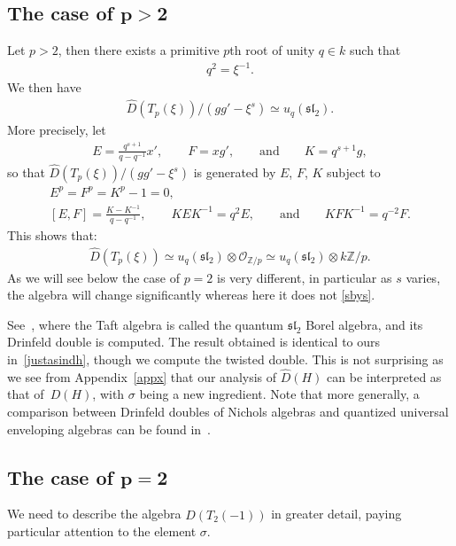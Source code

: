 \documentclass[pdftex]{sigma}
\numberwithin{equation}{section}
\newcommand{\ot}{\otimes}
\newcommand{\zp}{\mathbb{Z}/p}
\begin{document}
\subsection[The case of p>2]{The case of $\boldsymbol{p>2}$}
Let $p>2$, then there exists a primitive $p$th root of unity $q\in k$ such that
\begin{gather}
q^2=\xi^{-1}.
\end{gather}
We then have
\begin{gather}\label{sbys}
\widehat{D}(T_p(\xi))/(gg'-\xi^s)\simeq u_q({\mathfrak{sl}}_2).
\end{gather}
More precisely, let
\begin{gather}
E=\frac{q^{s+1}}{q-q^{-1}}x', \qquad
F=xg',\qquad\text{and}\qquad
K=q^{s+1}g,
\end{gather}
so that $\widehat{D}(T_p(\xi))/(gg'-\xi^s)$ is generated by $E$, $F$, $K$ subject to
\begin{gather*}
E^p=F^p=K^p-1=0,
\\
[E,F]=\frac{K-K^{-1}}{q-q^{-1}},\qquad
KEK^{-1}=q^2E,\qquad \text{and}\qquad KFK^{-1}=q^{-2}F.
\end{gather*}
This shows that:
\begin{gather}\label{justasindh}
\widehat{D}(T_p(\xi))\simeq u_q({\mathfrak{sl}}_2)\ot\mathcal{O}_{\zp}\simeq u_q({\mathfrak{sl}}_2)\ot k\zp.
\end{gather}
As we will see below the case of $p=2$ is very different, in particular as $s$ varies, the algebra will change significantly whereas here it does not \eqref{sbys}.

\begin{Remark}\label{DD}
See~\cite{uqsl2}, where the Taft algebra is called the quantum ${\mathfrak{sl}}_2$ Borel algebra, and its Drinfeld double is computed. The result obtained is identical to ours in~\eqref{justasindh}, though we compute the twisted double. This is not surprising as we see from Appendix~\ref{appx} that our analysis of $\widehat{D}(H)$ can be interpreted as that of~$D(H)$, with $\sigma$ being a new ingredient. Note that more generally, a comparison between Drinfeld doubles of Nichols algebras and quantized universal enveloping algebras can be found in~\cite{extra}.
\end{Remark}

\subsection[The case of p=2]{The case of $\boldsymbol{p=2}$}
We need to describe the algebra $\widehat{D}(T_2(-1))$ in greater detail, paying particular attention to the element $\sigma$.
\end{document}
